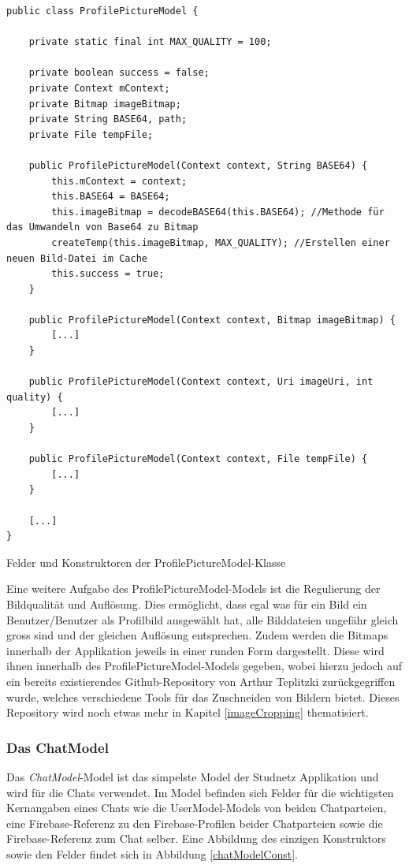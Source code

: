 \documentclass[../main.tex]{subfiles}
\begin{document}
\begin{code}
	\begin{center}
		\begin{verbatim}
public class ProfilePictureModel {

	private static final int MAX_QUALITY = 100;

	private boolean success = false;
	private Context mContext;
	private Bitmap imageBitmap;
	private String BASE64, path;
	private File tempFile;

	public ProfilePictureModel(Context context, String BASE64) {
		this.mContext = context;
		this.BASE64 = BASE64;
		this.imageBitmap = decodeBASE64(this.BASE64); //Methode für das Umwandeln von Base64 zu Bitmap
		createTemp(this.imageBitmap, MAX_QUALITY); //Erstellen einer neuen Bild-Datei im Cache
		this.success = true;
	}

	public ProfilePictureModel(Context context, Bitmap imageBitmap) {
		[...]
	}

	public ProfilePictureModel(Context context, Uri imageUri, int quality) {
		[...]
	}

	public ProfilePictureModel(Context context, File tempFile) {
		[...]
	}
	
	[...]
}
		\end{verbatim}
		\caption{Felder und Konstruktoren der ProfilePictureModel-Klasse}
		\label{profilePictureModelConst}
	\end{center}
	
\end{code}

	Eine weitere Aufgabe des ProfilePictureModel-Models ist die Regulierung der Bildqualität und Auflösung. Dies ermöglicht, dass egal was für ein Bild ein Benutzer/Benutzer als Profilbild ausgewählt hat, alle Bilddateien ungefähr gleich gross sind und der gleichen Auflösung entsprechen. Zudem werden die Bitmaps innerhalb der Applikation jeweils in einer runden Form dargestellt. Diese wird ihnen innerhalb des ProfilePictureModel-Models gegeben, wobei hierzu jedoch auf ein bereits existierendes Github-Repository von Arthur Teplitzki \cite{Cropper}zurückgegriffen wurde, welches verschiedene Tools für das Zuschneiden von Bildern bietet. Dieses Repository wird noch etwas mehr in Kapitel \ref{imageCropping} thematisiert.
	
	\subsubsection{Das ChatModel}
	Das \emph{ChatModel}-Model ist das simpelste Model der Studnetz Applikation und wird für die Chats verwendet. Im Model befinden sich Felder für die wichtigsten Kernangaben eines Chats wie die UserModel-Models von beiden Chatparteien, eine Firebase-Referenz zu den Firebase-Profilen beider Chatparteien sowie die Firebase-Referenz zum Chat selber. Eine Abbildung des einzigen Konstruktors sowie den Felder findet sich in Abbildung \ref{chatModelConst}.
	
\end{document}
